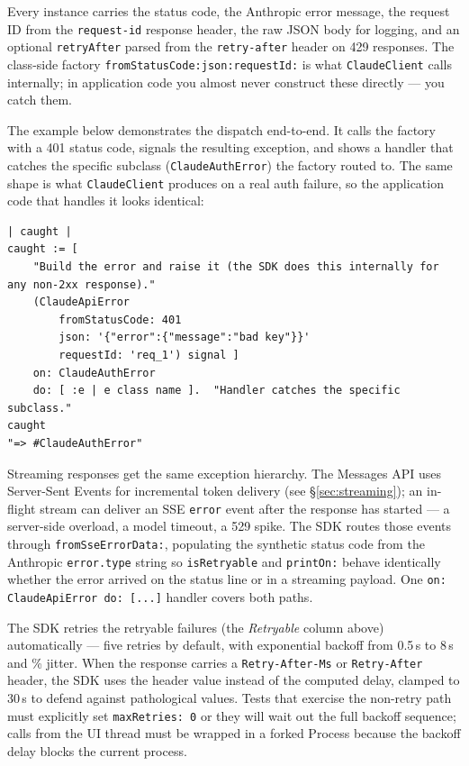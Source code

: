 \documentclass[a4paper,10pt,fleqn]{article}
\begin{document}
Every instance carries the status code, the Anthropic error message,
the request ID from the \texttt{request-id} response header, the raw
JSON body for logging, and an optional \texttt{retryAfter} parsed
from the \texttt{retry-after} header on 429 responses.  The
class-side factory \texttt{fromStatusCode:json:requestId:} is what
\texttt{ClaudeClient} calls internally; in application code you
almost never construct these directly --- you catch them.

The example below demonstrates the dispatch end-to-end.  It calls
the factory with a 401 status code, signals the resulting
exception, and shows a handler that catches the specific subclass
(\texttt{ClaudeAuthError}) the factory routed to.  The same shape
is what \texttt{ClaudeClient} produces on a real auth failure, so
the application code that handles it looks identical:

\begin{lstlisting}[language={}]
| caught |
caught := [
    "Build the error and raise it (the SDK does this internally for any non-2xx response)."
    (ClaudeApiError
        fromStatusCode: 401
        json: '{"error":{"message":"bad key"}}'
        requestId: 'req_1') signal ]
    on: ClaudeAuthError
    do: [ :e | e class name ].  "Handler catches the specific subclass."
caught
"=> #ClaudeAuthError"
\end{lstlisting}

Streaming responses get the same exception hierarchy.  The
Messages API uses Server-Sent Events for incremental token
delivery (see \S\ref{sec:streaming}); an in-flight stream can
deliver an SSE \texttt{error} event after the response has started
--- a server-side overload, a model timeout, a 529 spike.  The SDK
routes those events through \texttt{fromSseErrorData:}, populating
the synthetic status code from the Anthropic \texttt{error.type}
string so \texttt{isRetryable} and \texttt{printOn:} behave
identically whether the error arrived on the status line or in a
streaming payload.  One \texttt{on: ClaudeApiError do: [...]}
handler covers both paths.

The SDK retries the retryable failures (the \emph{Retryable}
column above) automatically --- five retries by default, with
exponential backoff from 0.5\,s to 8\,s and \% jitter.
When the response carries a \texttt{Retry-After-Ms} or
\texttt{Retry-After} header, the SDK uses the header value instead
of the computed delay, clamped to 30\,s to defend against
pathological values.  Tests that exercise the non-retry path must
explicitly set \texttt{maxRetries: 0} or they will wait out the
full backoff sequence; calls from the UI thread must be wrapped in
a forked Process because the backoff delay blocks the current
process.
\end{document}

